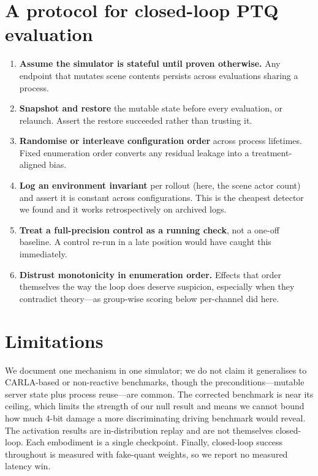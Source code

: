 \documentclass[conference]{IEEEtran}
\begin{document}
\section{A protocol for closed-loop PTQ evaluation}
\begin{enumerate}
\item \textbf{Assume the simulator is stateful until proven otherwise.} Any endpoint that mutates
scene contents persists across evaluations sharing a process.
\item \textbf{Snapshot and restore} the mutable state before every evaluation, or relaunch. Assert
the restore succeeded rather than trusting it.
\item \textbf{Randomise or interleave configuration order} across process lifetimes. Fixed
enumeration order converts any residual leakage into a treatment-aligned bias.
\item \textbf{Log an environment invariant} per rollout (here, the scene actor count) and assert
it is constant across configurations. This is the cheapest detector we found and it works
retrospectively on archived logs.
\item \textbf{Treat a full-precision control as a running check}, not a one-off baseline. A
control re-run in a late position would have caught this immediately.
\item \textbf{Distrust monotonicity in enumeration order.} Effects that order themselves the way
the loop does deserve suspicion, especially when they contradict theory---as group-wise scoring
below per-channel did here.
\end{enumerate}

\section{Limitations}
We document one mechanism in one simulator; we do not claim it generalises to CARLA-based or
non-reactive benchmarks, though the preconditions---mutable server state plus process reuse---are
common. The corrected benchmark is near its ceiling, which limits the strength of our null result
and means we cannot bound how much 4-bit damage a more discriminating driving benchmark would
reveal. The activation results are in-distribution replay and are not themselves closed-loop.
Each embodiment is a single checkpoint. Finally, closed-loop success throughout is measured with
fake-quant weights, so we report no measured latency win.
\end{document}
